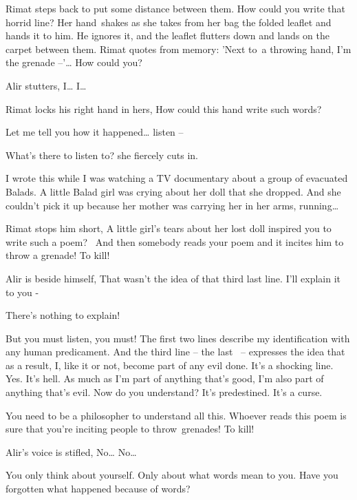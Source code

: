 \documentclass[12pt]{book}
\begin{document}
Rimat steps back to put some distance between them. {\textquotedbl}How could you write that horrid line?{\textquotedbl}
Her hand~shakes as she takes from her bag the folded leaflet and hands it to him. He ignores it, and the leaflet
flutters down and lands on the carpet between them. Rimat quotes from memory: {\textquotedbl}'Next to~a throwing hand,
I'm the grenade --'{\dots} How could you?{\textquotedbl}

Alir stutters, {\textquotedbl}I{\dots} I{\dots}{\textquotedbl}

Rimat locks his right hand in hers, {\textquotedbl}How could this hand write such words?{\textquotedbl}

{\textquotedbl}Let me tell you how it happened{\dots} listen -- {\textquotedbl}

{\textquotedbl}What's there to listen to?{\textquotedbl} she fiercely cuts in.

{\textquotedbl}I wrote this while I was watching a TV documentary about a group of evacuated Balads. A little Balad girl
was crying about her doll that she dropped. And she couldn't pick it up because her mother was carrying her in her
arms, running{\dots}{\textquotedbl}

Rimat stops him short, {\textquotedbl}A little girl's tears about her lost doll inspired you to write such a poem?~ And
then somebody reads your poem and it incites him to throw a grenade! To kill!{\textquotedbl}

Alir is beside himself, {\textquotedbl}That wasn't the idea of that third last line. I'll explain it to you
-{\textquotedbl}

{\textquotedbl}There's nothing to explain!{\textquotedbl}

{\textquotedbl}But you must listen, you must! The first two lines describe my identification with any human predicament.
And the third line -- the last \ {}-- expresses the idea that as a result, I, like it or not, become part of any evil
done. It's a shocking line. Yes. It's hell. As much as I'm part of anything that's good, I'm also part of anything
that's evil. Now do you understand? It's predestined. It's a curse.{\textquotedbl}

{\textquotedbl}You need to be a philosopher to understand all this. Whoever reads this poem is sure that you're inciting
people to throw~grenades! To kill!{\textquotedbl}

Alir's voice is stifled, {\textquotedbl}No{\dots} No{\dots}{\textquotedbl}

{\textquotedbl}You only think about yourself. Only about what words mean to you. Have you forgotten what happened
because of words?{\textquotedbl}
\end{document}
